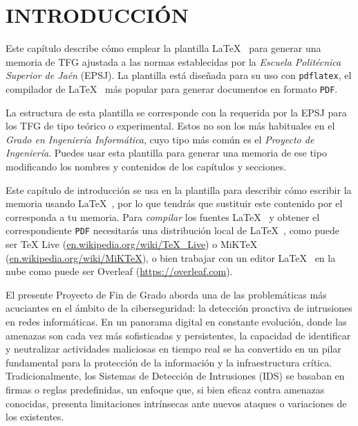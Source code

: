 
\chapter{INTRODUCCIÓN}  

Este capítulo describe cómo emplear la plantilla \LaTeX~ para generar una memoria de TFG ajustada a las normas establecidas por la \textit{Escuela Politécnica Superior de Jaén} (EPSJ). La plantilla está diseñada para su uso con \verb*|pdflatex|, el compilador de \LaTeX~ más popular para generar documentos en formato \verb*|PDF|.

La estructura de esta plantilla se corresponde con la requerida por la EPSJ para los TFG de tipo teórico o experimental. Estos no son los más habituales en el \textit{Grado en Ingeniería Informática}, cuyo tipo más común es el \textit{Proyecto de Ingeniería}. Puedes usar esta plantilla para generar una memoria de ese tipo modificando los nombres y contenidos de los capítulos y secciones.

Este capítulo de introducción se usa en la plantilla para describir cómo escribir la memoria usando \LaTeX~, por lo que tendrás que sustituir este contenido por el corresponda a tu memoria. Para \textit{compilar} los fuentes \LaTeX~ y obtener el correspondiente \verb*|PDF| necesitarás una distribución local de \LaTeX~, como puede ser TeX Live (\url{en.wikipedia.org/wiki/TeX\_Live}) o MiKTeX (\url{en.wikipedia.org/wiki/MiKTeX}), o bien trabajar con un editor \LaTeX~ en la nube como puede ser Overleaf (\url{https://overleaf.com}).


El presente Proyecto de Fin de Grado aborda una de las problemáticas más acuciantes en el ámbito de la ciberseguridad: la detección proactiva de intrusiones en redes informáticas. En un panorama digital en constante evolución, donde las amenazas son cada vez más sofisticadas y persistentes, la capacidad de identificar y neutralizar actividades maliciosas en tiempo real se ha convertido en un pilar fundamental para la protección de la información y la infraestructura crítica. Tradicionalmente, los Sistemas de Detección de Intrusiones (IDS) se basaban en firmas o reglas predefinidas, un enfoque que, si bien eficaz contra amenazas conocidas, presenta limitaciones intrínsecas ante nuevos ataques o variaciones de los existentes.

